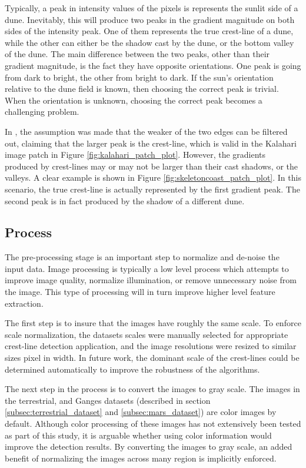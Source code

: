 Typically, a peak in intensity values of the pixels is represents the sunlit side of a dune. Inevitably, this will produce two peaks in the gradient magnitude on both sides of the intensity peak. One of them represents the true crest-line of a dune, while the other can either be the shadow cast by the dune, or the bottom valley of the dune. The main difference between the two peaks, other than their gradient magnitude, is the fact they have opposite orientations. One peak is going from dark to bright, the other from bright to dark. If the sun's orientation relative to the dune field is known, then choosing the correct peak is trivial. When the orientation is unknown, choosing the correct peak becomes a challenging problem. 

In \cite{2015_automated_mapping_of_linear_dunefield}, the assumption was made that the weaker of the two edges can be filtered out, claiming that the larger peak is the crest-line, which is valid in the Kalahari image patch in Figure \ref{fig:kalahari_patch_plot}. However, the gradients produced by crest-lines may or may not be larger than their cast shadows, or the valleys. A clear example is shown in Figure \ref{fig:skeletoncoast_patch_plot}. In this scenario, the true crest-line is actually represented by the first gradient peak. The second peak is in fact produced by the shadow of a different dune.

\subsection{Process}

The pre-processing stage is an important step to normalize and de-noise the input data. Image processing is typically a low level process which attempts to improve image quality, normalize illumination, or remove unnecessary noise from the image. This type of processing will in turn improve higher level feature extraction.

The first step is to insure that the images have roughly the same scale. To enforce scale normalization, the datasets scales were manually selected for appropriate crest-line detection application, and the image resolutions were resized to similar sizes pixel in width. In future work, the dominant scale of the crest-lines could be determined automatically to improve the robustness of the algorithms.

The next step in the process is to convert the images to gray scale. The images in the terrestrial, and Ganges datasets (described in section \ref{subsec:terrestrial_dataset} and \ref{subsec:mars_dataset}) are color images by default. Although color processing of these images has not extensively been tested as part of this study, it is arguable whether using color information would improve the detection results. By converting the images to gray scale, an added benefit of normalizing the images across many region is implicitly enforced.

